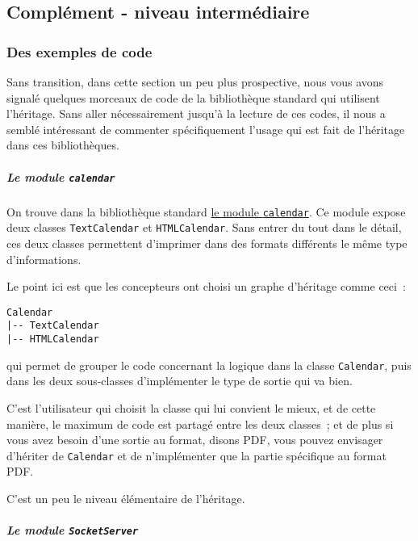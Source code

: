     \hypertarget{compluxe9ment---niveau-intermuxe9diaire}{%
\subsection{Complément - niveau
intermédiaire}\label{compluxe9ment---niveau-intermuxe9diaire}}

    \hypertarget{des-exemples-de-code}{%
\subsubsection{Des exemples de code}\label{des-exemples-de-code}}

    Sans transition, dans cette section un peu plus prospective, nous vous
avons signalé quelques morceaux de code de la bibliothèque standard qui
utilisent l'héritage. Sans aller nécessairement jusqu'à la lecture de
ces codes, il nous a semblé intéressant de commenter spécifiquement
l'usage qui est fait de l'héritage dans ces bibliothèques.

    \hypertarget{le-module-calendar}{%
\subparagraph{\texorpdfstring{Le module
\texttt{calendar}}{Le module calendar}}\label{le-module-calendar}}

    On trouve dans la bibliothèque standard
\href{https://docs.python.org/3/library/calendar.html}{le module
\texttt{calendar}}. Ce module expose deux classes \texttt{TextCalendar}
et \texttt{HTMLCalendar}. Sans entrer du tout dans le détail, ces deux
classes permettent d'imprimer dans des formats différents le même type
d'informations.

Le point ici est que les concepteurs ont choisi un graphe d'héritage
comme ceci~:

\begin{verbatim}
Calendar
|-- TextCalendar
|-- HTMLCalendar
\end{verbatim}

qui permet de grouper le code concernant la logique dans la classe
\texttt{Calendar}, puis dans les deux sous-classes d'implémenter le type
de sortie qui va bien.

C'est l'utilisateur qui choisit la classe qui lui convient le mieux, et
de cette manière, le maximum de code est partagé entre les deux
classes~; et de plus si vous avez besoin d'une sortie au format, disons
PDF, vous pouvez envisager d'hériter de \texttt{Calendar} et de
n'implémenter que la partie spécifique au format PDF.

C'est un peu le niveau élémentaire de l'héritage.

    \hypertarget{le-module-socketserver}{%
\subparagraph{\texorpdfstring{Le module
\texttt{SocketServer}}{Le module SocketServer}}\label{le-module-socketserver}}

